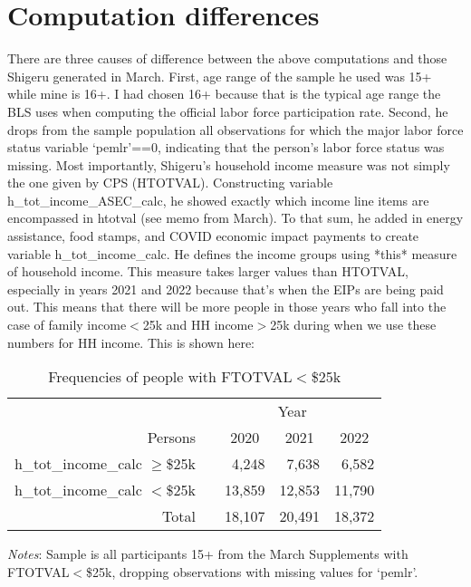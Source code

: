 \documentclass{article}
\newcommand{\mct}[1]{\multicolumn{1}{c}{#1}}
\newcommand{\mc}[3]{\multicolumn{#1}{#2}{#3}}
\begin{document}
	\section{Computation differences} 
	There are three causes of difference between the above computations and those Shigeru generated in March. First, age range of the sample he used was 15+ while mine is 16+. I had chosen 16+ because that is the typical age range the BLS uses when computing the official labor force participation rate. Second, he drops from the sample population all observations for which the major labor force status variable `pemlr'==0, indicating that the person's labor force status was missing. 
	Most importantly, Shigeru's household income measure was not simply the one given by CPS (HTOTVAL). Constructing variable h\_tot\_income\_ASEC\_calc, he showed exactly which income line items are encompassed in htotval (see memo from March). To that sum, he added in energy assistance, food stamps, and COVID economic impact payments to create variable h\_tot\_income\_calc. He defines the income groups using *this* measure of household income. This measure takes larger values than HTOTVAL, especially in years 2021 and 2022 because that's when the EIPs are being paid out. This means that there will be more people in those years who fall into the case of family income$<$25k and HH income$>$25k during when we use these numbers for HH income. This is shown here:
	\begin{table}[H]
		\centering
		\caption{Frequencies of people with FTOTVAL$<$\$25k}
		\begin{tabularx}{0.8\textwidth}{@{\extracolsep{\fill}}r r r r r }
			\toprule 
			& \mc{4}{c}{Year}  \\ \cmidrule(lr){2-5}
			Persons 	& 		&	\mct{2020}	&	\mct{2021}	&	\mct{2022}	\\ \midrule
			h\_tot\_income\_calc $\ge$\$25k \hspace{0.1cm}  	&	&	4,248	&	7,638	&	6,582	\\
			h\_tot\_income\_calc $<$\$25k \hspace{0.1cm} 		&	&	13,859	&	12,853	&	11,790	\\
			\midrule
			Total \hspace{0.1cm} 		&	&	18,107	&	20,491	&	18,372	\\
			\bottomrule
		\end{tabularx}
		\vspace{1mm}
		\vspace{1mm}
		\begin{minipage}[t]{\textwidth}
			\footnotesize{\emph{Notes}: Sample is all participants 15+ from the March Supplements with FTOTVAL$<$\$25k, dropping observations with missing values for `pemlr'.}
		\end{minipage}
	\end{table} 
	
\end{document}
